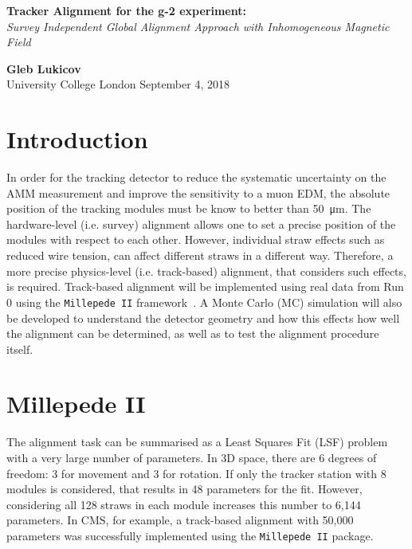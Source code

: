 \documentclass[a4paper,11pt]{article}
\begin{document}
\thispagestyle{empty}
\begin{titlepage}
\begin{center}
\end{center}
\begin{center}
	\vspace{1cm}
	{\huge \textbf{Tracker Alignment for the g-2 experiment:} \\ \textit{Survey Independent Global Alignment Approach with Inhomogeneous Magnetic Field} }\\
	\vspace{1.5cm}

	\vspace{6cm}
	{\LARGE\bf Gleb Lukicov}\\
	{\Large University College London}
	\vspace{4cm}
	\vfill
	\vspace{0.9cm}
	{\large September 4, 2018}
\end{center}
\end{titlepage}
\clearpage

\thispagestyle{plain}

\clearpage
\section{Introduction}
In order for the tracking detector to reduce the systematic uncertainty on the AMM measurement and improve the sensitivity to a muon EDM, the absolute position of the tracking modules must be know to better than \SI{50}{\micro\metre}. The hardware-level (i.e. survey) alignment allows one to set a precise position of the modules with respect to each other. However, individual straw effects such as reduced wire tension, can affect different straws in a different way. Therefore, a more precise physics-level (i.e. track-based) alignment, that considers such effects, is required. Track-based alignment will be implemented using real data from Run 0 using the \texttt{Millepede II} framework~\cite{mp2}. A Monte Carlo (MC) simulation will also be developed to understand the detector geometry and how this effects how well the alignment can be determined, as well as to test the alignment procedure itself. 

\section{Millepede II}
The alignment task can be summarised as a Least Squares Fit (LSF) problem with a very large number of parameters. In 3D space, there are 6 degrees of freedom: 3 for movement and 3 for rotation. If only the tracker station with 8 modules is considered, that results in 48 parameters for the fit. However, considering all 128 straws in each module increases this number to 6,144 parameters. In CMS, for example, a track-based alignment with 50,000 parameters was successfully implemented \cite{CMS} using the \texttt{Millepede II} package. 
\end{document}
